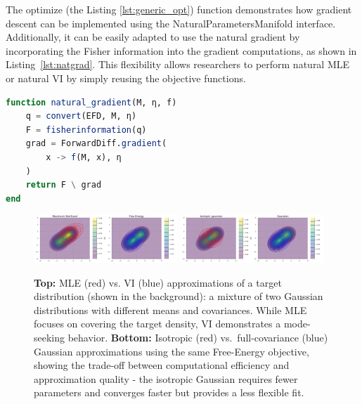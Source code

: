 \documentclass{juliacon}
\newcommand{\dmitry}[2][] {\todo[inline,backgroundcolor=teal!20!white, #1]{(dmitry) #2}}
\newcommand{\code}[1]{\textsf{#1}}
\begin{document}
The \code{optimize} (the Listing \ref{lst:generic_opt}) function demonstrates how gradient descent can be implemented using the \code{NaturalParametersManifold} interface. Additionally, it can be easily adapted to use the natural gradient \cite{amari_natural_1998} by incorporating the Fisher information into the gradient computations, as shown in Listing~\ref{lst:natgrad}. This flexibility allows researchers to perform natural MLE or natural VI by simply reusing the objective functions.

\begin{lstlisting}[language=Julia, label={lst:natgrad}, caption={Implementing the natural gradient}]
function natural_gradient(M, η, f)
    q = convert(EFD, M, η)
    F = fisherinformation(q)
    grad = ForwardDiff.gradient(
        x -> f(M, x), η
    )
    return F \ grad
end
\end{lstlisting}



\begin{figure}[tb]
   \includegraphics[width=0.48\textwidth]{plots/comparison1.pdf}
   \includegraphics[width=0.48\textwidth]{plots/comparison2.pdf}
   \caption{\textbf{Top:} MLE (red) vs. VI (blue) approximations of a target distribution (shown in the background): a mixture of two Gaussian distributions with different means and covariances. While MLE focuses on covering the target density, VI demonstrates a mode-seeking behavior. \textbf{Bottom:} Isotropic (red) vs.\ full-covariance (blue) Gaussian approximations using the same Free-Energy objective, showing the trade-off between computational efficiency and approximation quality - the isotropic Gaussian requires fewer parameters and converges faster but provides a less flexible fit.}
   \label{fig:comparisons}
\end{figure}
\end{document}
